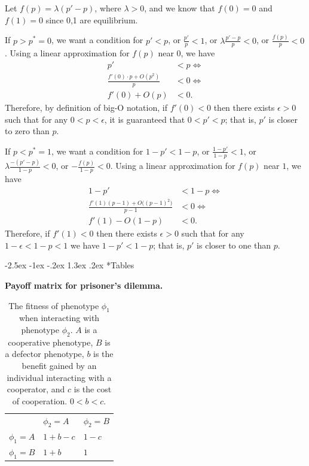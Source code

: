\documentclass[12pt]{extarticle}
\makeatletter
\renewcommand\section{\@startsection {section}{1}{\z@}%
     {-2.5ex \@plus -1ex \@minus -.2ex}%
     {1.3ex \@plus.2ex}%
    {\Large\bfseries}}
\makeatother
\begin{document}
{\begin{appendices}
Let $f(p)=\lambda(p'-p)$, where $\lambda>0$, and we know that $f(0)=0$ and $f(1)=0$ since 0,1 are equilibrium.

If $p>p^*=0$, we want a condition for $p'<p$, or
$\frac{p'}{p}<1$, or
$\lambda \frac{p'-p}{p} < 0$, or
$\frac{f(p)}{p} < 0$.
Using a linear approximation for $f(p)$ near $0$, we have
\begin{equation}\begin{aligned}
p' &< p \Leftrightarrow \\
\frac{f'(0) \cdot p + O(p^2)}{p} &< 0 \Leftrightarrow \\
f'(0) + O(p) &< 0.
\end{aligned}\end{equation}
Therefore, by definition of big-O notation, if $f'(0)<0$ then there exists $\epsilon>0$ such that for any $0<p<\epsilon$, it is guaranteed that $0<p'<p$; that is, $p'$ is closer to zero than $p$.

If $p<p^*=1$, we want a condition for $1-p' < 1-p$, or
$\frac{1-p'}{1-p}<1$, or
$\lambda \frac{-(p'-p)}{1-p} < 0$, or
$-\frac{f(p)}{1-p} < 0$.
Using a linear approximation for $f(p)$ near $1$, we have
\begin{equation}\begin{aligned}
1-p' &< 1-p  \Leftrightarrow \\
\frac{f'(1)(p-1) + O\big((p-1)^2\big)}{p-1} &< 0 \Leftrightarrow \\
f'(1) - O(1-p) &< 0.
\end{aligned}\end{equation}
Therefore, if $f'(1)<0$ then there exists $\epsilon>0$ such that for any $1-\epsilon<1-p<1$ we have $1-p'<1-p$; that is, $p'$ is closer to one than $p$.
\end{appendices}






\newpage

\section*{Tables}

\bigskip
\begin{table}[h]
\centering
\caption{\textbf{Payoff matrix for prisoner's dilemma.}}
\begin{tabular}{lll}
\toprule
           & $\phi_2=A$ & $\phi_2=B$ \\ \cmidrule(r){1-3}
$\phi_1=A$ & $1+b-c$ & $1-c$ \\
$\phi_1=B$ & $1+b$   & $1$
\\ \bottomrule
\end{tabular}
\label{table:prisoner_payoff}
\caption*{
The fitness of phenotype $\phi_1$ when interacting with phenotype $\phi_2$. $A$ is a cooperative phenotype, $B$ is a defector phenotype, $b$ is the benefit gained by an individual interacting with a cooperator, and $c$ is the cost of cooperation. $0<b<c$.
}
\end{table}
\bigskip

}
\end{document}
